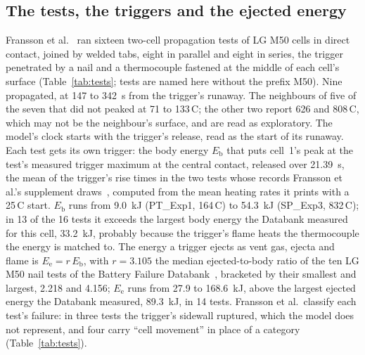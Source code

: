 \documentclass[preprint,12pt]{elsarticle}
\newcommand{\degC}{\,\textdegree C}
\newcommand{\Eb}{E_{\mathrm{b}}}
\newcommand{\Ee}{E_{\mathrm{e}}}
\begin{document}
\subsection{The tests, the triggers and the ejected energy}
\label{sec:tests}

Fransson et al.~\cite{fransson2024exploring} ran sixteen two-cell propagation tests of LG M50 cells in direct contact, joined by welded tabs, eight in parallel and eight in series, the trigger penetrated by a nail and a thermocouple fastened at the middle of each cell's surface (Table~\ref{tab:tests}; tests are named here without the prefix M50). Nine propagated, at 147 to 342~s from the trigger's runaway. The neighbours of five of the seven that did not peaked at 71 to 133\degC; the other two report 626 and 808\degC, which may not be the neighbour's surface, and are read as exploratory. The model's clock starts with the trigger's release, read as the start of its runaway. Each test gets its own trigger: the body energy $\Eb$ that puts cell~1's peak at the test's measured trigger maximum at the central contact, released over 21.39~s, the mean of the trigger's rise times in the two tests whose records Fransson et al.'s supplement draws~\cite{fransson2024exploring}, computed from the mean heating rates it prints with a 25\degC{} start. $\Eb$ runs from 9.0~kJ (PT\_Exp1, 164\degC) to 54.3~kJ (SP\_Exp3, 832\degC); in 13 of the 16 tests it exceeds the largest body energy the Databank measured for this cell, 33.2~kJ, probably because the trigger's flame heats the thermocouple the energy is matched to. The energy a trigger ejects as vent gas, ejecta and flame is $\Ee=r\,\Eb$, with $r=3.105$ the median ejected-to-body ratio of the ten LG M50 nail tests of the Battery Failure Databank~\cite{finegan2024databank}, bracketed by their smallest and largest, 2.218 and 4.156; $\Ee$ runs from 27.9 to 168.6~kJ, above the largest ejected energy the Databank measured, 89.3~kJ, in 14 tests. Fransson et al.\ classify each test's failure: in three tests the trigger's sidewall ruptured, which the model does not represent, and four carry ``cell movement'' in place of a category (Table~\ref{tab:tests}).
\end{document}
